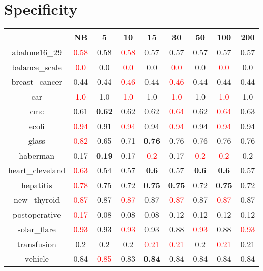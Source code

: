 \documentclass{article}%
\begin{document}
\section*{Specificity}%
\begin{tabular}{c|cccccccc}%
\hline%
&NB&5&10&15&30&50&100&200\\%
\hline%
abalone16\_29&\textcolor{red}{ 
0.58
}&0.58&\textcolor{red}{ 
0.58
}&0.57&0.57&0.57&0.57&0.57\\%
\hline%
balance\_scale&\textcolor{red}{ 
0.0
}&0.0&\textcolor{red}{ 
0.0
}&0.0&\textcolor{red}{ 
0.0
}&0.0&\textcolor{red}{ 
0.0
}&0.0\\%
\hline%
breast\_cancer&0.44&0.44&\textcolor{red}{ 
0.46
}&0.44&\textcolor{red}{ 
0.46
}&0.44&0.44&0.44\\%
\hline%
car&\textcolor{red}{ 
1.0
}&1.0&\textcolor{red}{ 
1.0
}&1.0&\textcolor{red}{ 
1.0
}&1.0&\textcolor{red}{ 
1.0
}&1.0\\%
\hline%
cmc&0.61&\textbf{0.62}&0.62&0.62&\textcolor{red}{ 
0.64
}&0.62&\textcolor{red}{ 
0.64
}&0.63\\%
\hline%
ecoli&\textcolor{red}{ 
0.94
}&0.91&\textcolor{red}{ 
0.94
}&0.94&\textcolor{red}{ 
0.94
}&0.94&\textcolor{red}{ 
0.94
}&0.94\\%
\hline%
glass&\textcolor{red}{ 
0.82
}&0.65&0.71&\textbf{0.76}&0.76&0.76&0.76&0.76\\%
\hline%
haberman&0.17&\textbf{0.19}&0.17&\textcolor{red}{ 
0.2
}&0.17&\textcolor{red}{ 
0.2
}&\textcolor{red}{ 
0.2
}&0.2\\%
\hline%
heart\_cleveland&\textcolor{red}{ 
0.63
}&0.54&0.57&\textbf{0.6}&0.57&\textbf{0.6}&\textbf{0.6}&0.57\\%
\hline%
hepatitis&\textcolor{red}{ 
0.78
}&0.75&0.72&\textbf{0.75}&\textbf{0.75}&0.72&\textbf{0.75}&0.72\\%
\hline%
new\_thyroid&\textcolor{red}{ 
0.87
}&0.87&\textcolor{red}{ 
0.87
}&0.87&\textcolor{red}{ 
0.87
}&0.87&\textcolor{red}{ 
0.87
}&0.87\\%
\hline%
postoperative&\textcolor{red}{ 
0.17
}&0.08&0.08&0.08&0.12&0.12&0.12&0.12\\%
\hline%
solar\_flare&\textcolor{red}{ 
0.93
}&0.93&\textcolor{red}{ 
0.93
}&0.93&0.88&\textcolor{red}{ 
0.93
}&0.88&\textcolor{red}{ 
0.93
}\\%
\hline%
transfusion&0.2&0.2&0.2&\textcolor{red}{ 
0.21
}&\textcolor{red}{ 
0.21
}&0.2&\textcolor{red}{ 
0.21
}&0.21\\%
\hline%
vehicle&0.84&\textcolor{red}{ 
0.85
}&0.83&\textbf{0.84}&0.84&0.84&0.84&0.84\\%

\end{tabular}
\end{document}

